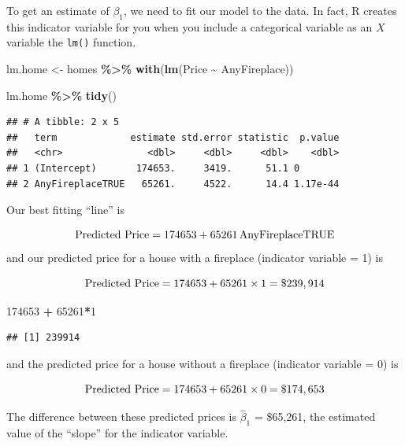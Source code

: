 \documentclass[
]{book}
\newenvironment{Shaded}{\begin{snugshade}}{\end{snugshade}}
\newcommand{\DecValTok}[1]{\textcolor[rgb]{0.00,0.00,0.81}{#1}}
\newcommand{\FunctionTok}[1]{\textcolor[rgb]{0.13,0.29,0.53}{\textbf{#1}}}
\newcommand{\NormalTok}[1]{#1}
\newcommand{\OtherTok}[1]{\textcolor[rgb]{0.56,0.35,0.01}{#1}}
\newcommand{\SpecialCharTok}[1]{\textcolor[rgb]{0.81,0.36,0.00}{\textbf{#1}}}
\begin{document}
To get an estimate of \(\beta_1\), we need to fit our model to the data. In fact, R creates this indicator variable for you when you include a categorical variable as an \(X\) variable the \texttt{lm()} function.

\begin{Shaded}
\begin{Highlighting}[]
\NormalTok{lm.home }\OtherTok{\textless{}{-}}\NormalTok{ homes }\SpecialCharTok{\%\textgreater{}\%}
  \FunctionTok{with}\NormalTok{(}\FunctionTok{lm}\NormalTok{(Price }\SpecialCharTok{\textasciitilde{}}\NormalTok{ AnyFireplace))}

\NormalTok{lm.home }\SpecialCharTok{\%\textgreater{}\%}
  \FunctionTok{tidy}\NormalTok{()}
\end{Highlighting}
\end{Shaded}

\begin{verbatim}
## # A tibble: 2 x 5
##   term             estimate std.error statistic  p.value
##   <chr>               <dbl>     <dbl>     <dbl>    <dbl>
## 1 (Intercept)       174653.     3419.      51.1 0       
## 2 AnyFireplaceTRUE   65261.     4522.      14.4 1.17e-44
\end{verbatim}

Our best fitting ``line'' is

\[ \hbox{Predicted Price} = 174653 + 65261\,\hbox{AnyFireplaceTRUE} \]
and our predicted price for a house with a fireplace (indicator variable = 1) is

\[ \hbox{Predicted Price} = 174653 + 65261 \times 1 = \$ 239,914 \]

\begin{Shaded}
\begin{Highlighting}[]
\DecValTok{174653} \SpecialCharTok{+} \DecValTok{65261}\SpecialCharTok{*}\DecValTok{1}
\end{Highlighting}
\end{Shaded}

\begin{verbatim}
## [1] 239914
\end{verbatim}

and the predicted price for a house without a fireplace (indicator variable = 0) is

\[\hbox{Predicted Price} = 174653 + 65261 \times 0 = \$ 174,653\]

The difference between these predicted prices is \(\hat{\beta}_1\) = \$65,261, the estimated value of the ``slope'' for the indicator variable.
\end{document}
